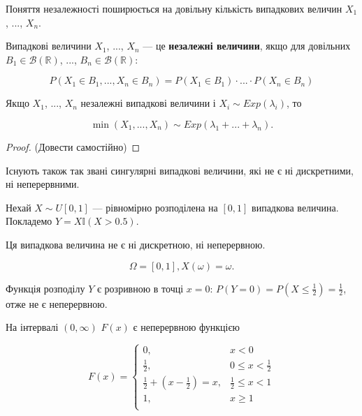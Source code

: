 Поняття незалежності поширюється на довільну кількість випадкових величин $X_1$, ..., $X_n$.

Випадкові величини $X_1$, ..., $X_n$ --- це \textbf{незалежні величини}, якщо для довільних
$B_1 \in \mathcal{B}(\mathbb{R})$, ..., $B_n \in \mathcal{B}(\mathbb{R})$:

\begin{equation}
    P(X_1 \in B_1, ..., X_n \in B_n)
    = P(X_1 \in B_1) \cdot ... \cdot P(X_n \in B_n)
\end{equation}

\begin{example}
    Якщо $X_1$, ..., $X_n$ незалежні випадкові величини і $X_i \sim Exp(\lambda_i)$, то

    $$\min(X_1, ..., X_n) \sim Exp(\lambda_1 + ... + \lambda_n).$$
    
\end{example}

\begin{proof}
    (Довести самостійно)
\end{proof}

\begin{remark}
    Існують також так звані сингулярні випадкові величини, які не є ні
    дискретними, ні неперервними.
\end{remark}

\begin{example}
    Нехай $X \sim U[0, 1]$ --- рівномірно розподілена на $[0, 1]$ випадкова
    величина. Покладемо $Y = X \mathbb{I}(X > 0.5)$.
\end{example}

Ця випадкова величина не є ні дискретною, ні неперервною.

\beautifulImage

$$\Omega = [0, 1], X(\omega) = \omega.$$

Функція розподілу $Y$ є розривною в точці $x = 0$:
$P(Y = 0) = P(X \leqslant \frac{1}{2}) = \frac{1}{2}$, отже не є неперервною.

На інтервалі $(0, \infty)$ $F(x)$ є неперервною функцією

$$F(x) = \left\{ \begin{array}{ll}
    0, & x < 0 \\
    \frac{1}{2}, & 0 \leqslant x < \frac{1}{2} \\
    \frac{1}{2} + (x - \frac{1}{2}) = x, & \frac{1}{2} \leqslant x < 1 \\
    1, & x \geqslant 1 \\
\end{array} \right.$$

